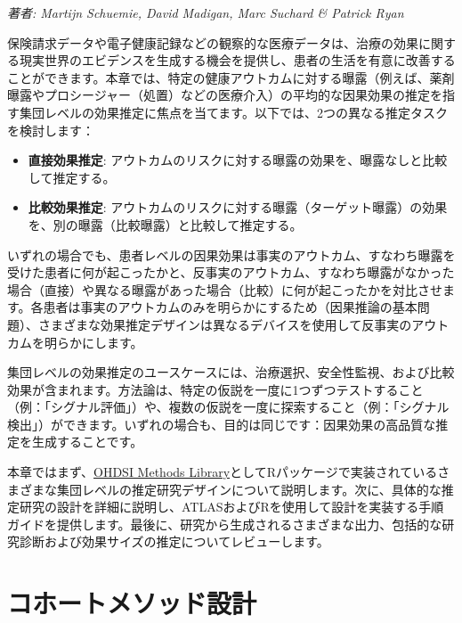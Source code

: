 \documentclass[
  11pt]{book}
\providecommand{\tightlist}{%
  \setlength{\itemsep}{0pt}\setlength{\parskip}{0pt}}
\theoremstyle{definition}
\theoremstyle{definition}
\theoremstyle{definition}
\theoremstyle{definition}
\theoremstyle{remark}
\begin{document}
\emph{著者: Martijn Schuemie, David Madigan, Marc Suchard \& Patrick Ryan}


保険請求データや電子健康記録などの観察的な医療データは、治療の効果に関する現実世界のエビデンスを生成する機会を提供し、患者の生活を有意に改善することができます。本章では、特定の健康アウトカムに対する曝露（例えば、薬剤曝露やプロシージャー（処置）などの医療介入）の平均的な因果効果の推定を指す集団レベルの効果推定に焦点を当てます。以下では、2つの異なる推定タスクを検討します：

\begin{itemize}
\tightlist
\item
  \textbf{直接効果推定}: アウトカムのリスクに対する曝露の効果を、曝露なしと比較して推定する。 
\item
  \textbf{比較効果推定}: アウトカムのリスクに対する曝露（ターゲット曝露）の効果を、別の曝露（比較曝露）と比較して推定する。 
\end{itemize}

いずれの場合でも、患者レベルの因果効果は事実のアウトカム、すなわち曝露を受けた患者に何が起こったかと、反事実のアウトカム、すなわち曝露がなかった場合（直接）や異なる曝露があった場合（比較）に何が起こったかを対比させます。各患者は事実のアウトカムのみを明らかにするため（因果推論の基本問題）、さまざまな効果推定デザインは異なるデバイスを使用して反事実のアウトカムを明らかにします。 

集団レベルの効果推定のユースケースには、治療選択、安全性監視、および比較効果が含まれます。方法論は、特定の仮説を一度に1つずつテストすること（例：「シグナル評価」）や、複数の仮説を一度に探索すること（例：「シグナル検出」）ができます。いずれの場合も、目的は同じです：因果効果の高品質な推定を生成することです。  

本章ではまず、\href{https://ohdsi.github.io/MethodsLibrary/}{OHDSI Methods Library}としてRパッケージで実装されているさまざまな集団レベルの推定研究デザインについて説明します。次に、具体的な推定研究の設計を詳細に説明し、ATLASおよびRを使用して設計を実装する手順ガイドを提供します。最後に、研究から生成されるさまざまな出力、包括的な研究診断および効果サイズの推定についてレビューします。

\section{コホートメソッド設計}\label{CohortMethod}
\end{document}
